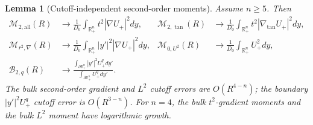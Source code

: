 \documentclass[11pt,reqno,a4paper]{amsart}
\newcommand{\R}{\mathbb{R}}
\numberwithin{equation}{section}
\theoremstyle{plain}
\newtheorem{lemma}[theorem]{Lemma}
\theoremstyle{remark}
\theoremstyle{plain}
\begin{document}
\begin{lemma}[Cutoff-independent second-order moments]
\label{lem:EW-cutoff-removal-detailed}
Assume $n\ge5$.  Then
\begin{align*}
\mathcal M_{2,\mathrm{all}}(R)&\longrightarrow
\frac{1}{D_0}\int_{\R^n_+}t^2|\nabla U_+|^2dy,
&
\mathcal M_{2,\tan}(R)&\longrightarrow
\frac{1}{D_0}\int_{\R^n_+}t^2|\nabla_{\tan} U_+|^2dy,\\
\mathcal M_{r^2,\nabla}(R)&\longrightarrow
\frac{1}{D_0}\int_{\R^n_+}|y'|^2|\nabla U_+|^2dy,
&
\mathcal M_{0,U^2}(R)&\longrightarrow
\frac{1}{D_0}\int_{\R^n_+}U_+^2dy,\\
\mathcal B_{2,q}(R)&\longrightarrow
\frac{\displaystyle\int_{\partial\R^n_+}|y'|^2U_+^qdy'}
{\displaystyle\int_{\partial\R^n_+}U_+^qdy'}.
\end{align*}
The bulk second-order gradient and $L^2$ cutoff errors are $O(R^{4-n})$; the boundary
$|y'|^2U_+^q$ cutoff error is $O(R^{3-n})$.  For $n=4$, the bulk $t^2$-gradient
moments and the bulk $L^2$ moment have logarithmic growth.
\end{lemma}
\end{document}
